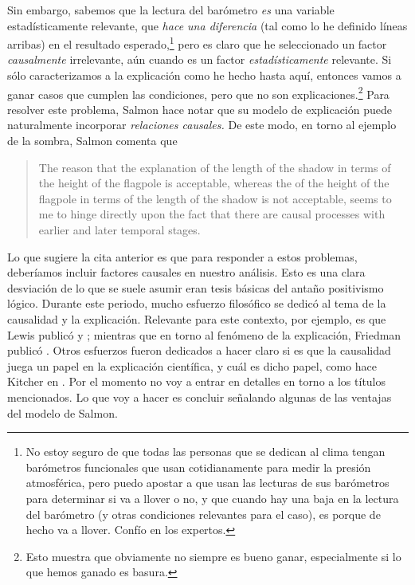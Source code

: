 Sin embargo, sabemos que la lectura del barómetro \emph{es}
una variable estadísticamente relevante, que \emph{hace una
diferencia} (tal como lo he definido líneas arribas) en el
resultado esperado,\footnote{
  No estoy seguro de que todas las personas que se dedican
  al clima tengan barómetros funcionales que usan
  cotidianamente para medir la presión atmosférica, pero
  puedo	apostar a que usan las lecturas de sus barómetros
  para determinar si va a llover o no, y que cuando hay una
  baja en la lectura del barómetro (y otras condiciones
  relevantes para el caso), es porque de	hecho va a llover.
  Confío en los expertos. 
}
pero es claro que he seleccionado un factor
\emph{causalmente} irrelevante, aún cuando es un factor
\emph{estadísticamente} relevante. Si sólo caracterizamos a
la explicación como he hecho hasta aquí, entonces vamos a
ganar casos que cumplen las condiciones, pero que no son
explicaciones.\footnote{
	Esto muestra que obviamente no siempre es bueno ganar,
	especialmente si lo que hemos ganado es basura.
} 
Para resolver este problema, Salmon hace notar que su modelo
de explicación puede naturalmente incorporar
\emph{relaciones causales.} De este modo, en torno al
ejemplo de la sombra, Salmon comenta que

	\begin{quote}
    The reason that the explanation of the length of the
    shadow in terms of the height of the flagpole is
    acceptable, whereas the  of the height
    of the flagpole in terms of the length of the shadow is
    not acceptable, seems to me to hinge directly upon the
    fact that there are causal processes with earlier and
    later temporal stages. \parencite[p.~72]{Salmon1970}
	\end{quote}
  
Lo que sugiere la cita anterior es que para responder a
estos problemas, deberíamos incluir factores causales en
nuestro análisis. Esto es una clara desviación de lo que se
suele asumir eran tesis básicas del antaño positivismo
lógico. Durante este periodo, mucho esfuerzo filosófico se
dedicó al tema de la causalidad y la explicación. Relevante
para este contexto, por ejemplo, es que Lewis publicó
 y ; mientras
que en torno al fenómeno de la explicación, Friedman publicó
. Otros esfuerzos fueron dedicados a
hacer claro si es que la causalidad juega un papel en la
explicación científica, y cuál es dicho papel, como hace
Kitcher en . Por el momento no voy a
entrar en detalles en torno a los títulos mencionados. Lo
que voy a hacer es concluir señalando algunas de las
ventajas del modelo de Salmon.

